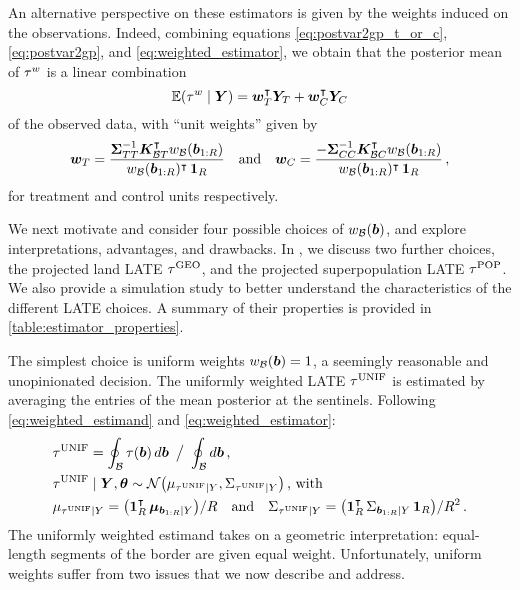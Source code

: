 An alternative perspective on these estimators is given by the weights induced on the observations.
Indeed, combining equations \autoref{eq:postvar2gp_t_or_c}, \autoref{eq:postvar2gp}, and \autoref{eq:weighted_estimator}, we obtain that the posterior mean of \(\tau^{w}\) is a linear combination
\begin{equation}
    \E\del{\tauw \mid \Yvec} = \wt\trans \yt + \wc\trans \yc
    \label{eq:unit_weights}
\end{equation}
of the observed data, with ``unit weights'' given by
\begin{equation}
        \bm{w}_{T} = \frac{
            \bm{\Sigma}_{T T}^{-1} 
            \bm{K}_{\mathcal{B} T}^{\intercal} w_{\mathcal{B}}(\bm{b}_{1:R})
        }{
            w_{\mathcal{B}}(\bm{b}_{1:R})^{\intercal} \operatorname{\mathbf{1}}_{R}
        }
        \quad\text{and}\quad
        \bm{w}_{C} = \frac{
            -
            \bm{\Sigma}_{C C}^{-1} 
            \bm{K}_{\mathcal{B} C}^{\intercal} w_{\mathcal{B}}(\bm{b}_{1:R})
        }{
            w_{\mathcal{B}}(\bm{b}_{1:R})^{\intercal} \operatorname{\mathbf{1}}_{R}
        }
        \,,
    \label{eq:unit_weights_gp}
\end{equation}
for treatment and control units respectively.

We next motivate and consider four possible choices of \(w_{\mathcal{B}}(\bm{b})\), and explore interpretations, advantages, and drawbacks. 
In \ofsupp{}, we discuss two further choices, the projected land LATE \(\tau^{\mathrm{GEO}}\), and the projected superpopulation LATE \(\tau^{\mathrm{POP}}\).
We also provide a simulation study to better understand the characteristics of the different LATE choices.
A summary of their properties is provided in \autoref{table:estimator_properties}.

The simplest choice is uniform weights \(w_{\mathcal{B}}(\bm{b})=1\), a seemingly reasonable and unopinionated decision.
The uniformly weighted LATE \(\tau^{\mathrm{UNIF}}\) is estimated by averaging the entries of the mean posterior at the sentinels.
Following \autoref{eq:weighted_estimand} and \autoref{eq:weighted_estimator}:
\begin{equation}\begin{split}
    &\unifavg = \oint_\border \tau(\sentinel) \dif\sentinel
        \ \big/ \ 
        \oint_\border \dif{\sentinel}  \,, \\
    &\unifavg \mid \Yvec, \hyperparam \sim \normal\del{\mu_{\unifavg \mid Y}, \Sigma_{\unifavg \mid Y}}\,\text{, with} \\
    &\mu_{\unifavg \mid Y} = \del{\ones_{\numsent}\trans \muvec_{\sentinels \mid Y}} / \numsent \quad\text{and}\quad
    \Sigma_{\unifavg \mid Y} = \del{\ones_{\numsent}\trans \Sigma_{\sentinels \mid Y} \ones_{\numsent}} / \numsent^2 \,.
\end{split}
\label{eq:unifavg}
\end{equation}
The uniformly weighted estimand takes on a geometric interpretation: equal-length segments of the border are given equal weight.
Unfortunately, uniform weights suffer from two issues that we now describe and address.

